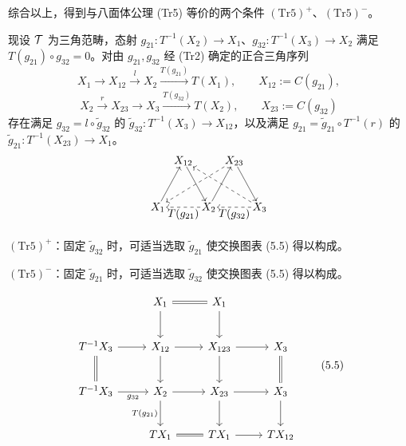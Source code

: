 综合以上，得到与八面体公理 (Tr5) 等价的两个条件 $(\mathrm{Tr}5)^+$、$(\mathrm{Tr}5)^-$。

现设 $\mathcal{T}$ 为三角范畴，态射 $g_{21}\colon T^{-1}(X_2)\to X_1$、$g_{32}\colon T^{-1}(X_3)\to X_2$ 满足 $T(g_{21})\circ g_{32}=0$。对由 $g_{21},g_{32}$ 经 (Tr2) 确定的正合三角序列
\[
X_1\to X_{12}\xrightarrow{l}X_2\xrightarrow{T(g_{21})}T(X_1),\qquad X_{12} := C(g_{21}),
\]
\[
X_2\xrightarrow{r}X_{23}\to X_3\xrightarrow{T(g_{32})}T(X_2),\qquad X_{23} := C(g_{32})
\]
存在满足 $g_{32}=l\circ\tilde g_{32}$ 的 $\tilde g_{32}\colon T^{-1}(X_3)\to X_{12}$，以及满足 $g_{21}=\tilde g_{21}\circ T^{-1}(r)$ 的 $\tilde g_{21}\colon T^{-1}(X_{23})\to X_1$。
\[
\begin{tikzpicture}[scale=0.95, every node/.style={inner sep=1pt}]
\node (X12) at (0.85,1.55) {$X_{12}$};
\node (X23) at (2.55,1.55) {$X_{23}$};
\node (X1) at (0,0) {$X_1$};
\node (X2) at (1.70,0) {$X_2$};
\node (X3) at (3.40,0) {$X_3$};
\draw[->] (X1) -- (X12);
\draw[->] (X12) -- (X2);
\draw[->] (X2) -- (X23);
\draw[->] (X23) -- (X3);
\draw[->,dashed] (X3) -- (X12);
\draw[->,dashed] (X23) -- (X1);
\draw[->,dashed] (X2) -- node[below] {$T(g_{21})$} (X1);
\draw[->,dashed] (X3) -- node[below] {$T(g_{32})$} (X2);
\end{tikzpicture}
\]


$(\mathrm{Tr}5)^+$：固定 $\tilde g_{32}$ 时，可适当选取 $\tilde g_{21}$ 使交换图表 (5.5) 得以构成。

$(\mathrm{Tr}5)^-$：固定 $\tilde g_{21}$ 时，可适当选取 $\tilde g_{32}$ 使交换图表 (5.5) 得以构成。

\begin{equation}
\begin{tikzcd}[row sep=2.3em, column sep=2.4em]
{} & X_1 \arrow[r,equal] \arrow[d] & X_1 \arrow[d] & {} \\
T^{-1}X_3 \arrow[r] \arrow[d,equal] & X_{12} \arrow[r] \arrow[d] & X_{123} \arrow[r] \arrow[d] & X_3 \arrow[d,equal] \\
T^{-1}X_3 \arrow[r,"g_{32}"'] & X_2 \arrow[r] \arrow[d,"T(g_{21})"'] & X_{23} \arrow[r] \arrow[d] & X_3 \arrow[d] \\
{} & TX_1 \arrow[r,equal] & TX_1 \arrow[r] & TX_{12}
\end{tikzcd} \tag{5.5}
\end{equation}

